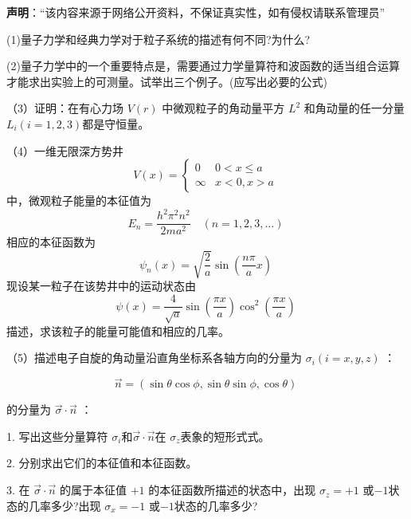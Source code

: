 
\textbf{声明}：“该内容来源于网络公开资料，不保证真实性，如有侵权请联系管理员”

(1)量子力学和经典力学对于粒子系统的描述有何不同?为什么?

(2)量子力学中的一个重要特点是，需要通过力学量算符和波函数的适当组合运算才能求出实验上的可测量。试举出三个例子。(应写出必要的公式)

（3）证明：在有心力场 $V(r)$ 中微观粒子的角动量平方 $ L^2 $ 和角动量的任一分量 $L_i (i=1,2,3)$都是守恒量。

（4）一维无限深方势井
$$V(x) = 
\begin{cases} 
0 & 0 < x \leq a \\
\infty & x < 0, x > a 
\end{cases}~$$
中，微观粒子能量的本征值为
$$E_n = \frac{h^2 \pi^2 n^2}{2ma^2} \quad (n = 1, 2, 3, \ldots)~$$
相应的本征函数为
$$\psi_n(x) = \sqrt{\frac{2}{a}} \sin \left( \frac{n \pi }{a} x \right)~$$
现设某一粒子在该势井中的运动状态由
$$\psi(x) = \frac{4}{\sqrt{a}} \sin \left( \frac{\pi x}{a} \right) \cos^2 \left( \frac{\pi x}{a} \right)~$$
描述，求该粒子的能量可能值和相应的几率。

（5）描述电子自旋的角动量沿直角坐标系各轴方向的分量为 $\sigma_i (i=x,y,z)$ ：

$$\vec{n} = (\sin \theta \cos \phi, \sin \theta \sin \phi, \cos \theta)~$$

的分量为 $\vec{\sigma} \cdot \vec{n}$ ：

1. 写出这些分量算符 $\sigma_i$和$\vec{\sigma} \cdot \vec{n}$在 $\sigma_z$表象的短形式式。

2. 分别求出它们的本征值和本征函数。

3. 在 $\vec{\sigma} \cdot \vec{n}$ 的属于本征值 $+1$ 的本征函数所描述的状态中，出现 $\sigma_z = +1$ 或$-1$状态的几率多少?出现 $\sigma_x = -1$ 或$-1$状态的几率多少?